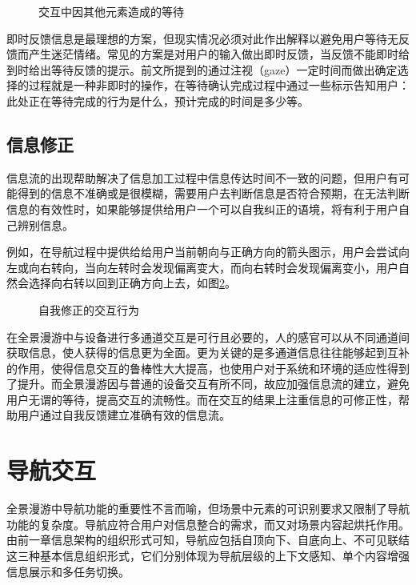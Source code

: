 \begin{figure}[htp]
\centering
{}
\caption{交互中因其他元素造成的等待}
\label{fig:stream}
\end{figure}

即时反馈信息是最理想的方案，但现实情况必须对此作出解释以避免用户等待无反馈而产生迷茫情绪。常见的方案是对用户的输入做出即时反馈，当反馈不能即时给到时给出等待反馈的提示。前文所提到的通过注视（gaze）一定时间而做出确定选择的过程就是一种非即时的操作，在等待确认完成过程中通过一些标示告知用户：此处正在等待完成的行为是什么，预计完成的时间是多少等。

\subsection{信息修正}
信息流的出现帮助解决了信息加工过程中信息传达时间不一致的问题，但用户有可能得到的信息不准确或是很模糊，需要用户去判断信息是否符合预期，在无法判断信息的有效性时，如果能够提供给用户一个可以自我纠正的语境，将有利于用户自己辨别信息。

例如，在导航过程中提供给给用户当前朝向与正确方向的箭头图示，用户会尝试向左或向右转向，当向左转时会发现偏离变大，而向右转时会发现偏离变小，用户自然会选择向右转以回到正确方向上去，如图\ref{fig:correct}。

\begin{figure}[htp]
\centering
{}
\caption{自我修正的交互行为}
\label{fig:correct}
\end{figure}

在全景漫游中与设备进行多通道交互是可行且必要的，人的感官可以从不同通道间获取信息，使人获得的信息更为全面。更为关键的是多通道信息往往能够起到互补的作用，使得信息交互的鲁棒性大大提高，也使用户对于系统和环境的适应性得到了提升。而全景漫游因与普通的设备交互有所不同，故应加强信息流的建立，避免用户无谓的等待，提高交互的流畅性。而在交互的结果上注重信息的可修正性，帮助用户通过自我反馈建立准确有效的信息流。

\section{导航交互}
全景漫游中导航功能的重要性不言而喻，但场景中元素的可识别要求又限制了导航功能的复杂度。导航应符合用户对信息整合的需求，而又对场景内容起烘托作用。由前一章信息架构的组织形式可知，导航应包括自顶向下、自底向上、不可见联结这三种基本信息组织形式，它们分别体现为导航层级的上下文感知、单个内容增强信息展示和多任务切换。

